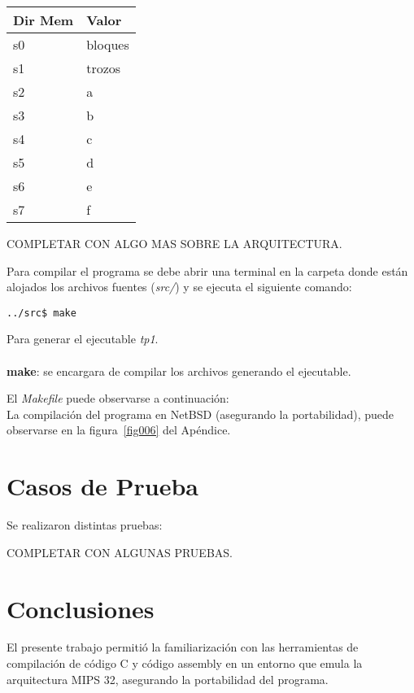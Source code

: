 \documentclass[a4paper,10pt]{article}
\begin{document}
\begin{center}
    \begin{tabular}{ | p{3cm} | p{3cm}  | }
    \hline
        Dir Mem & Valor \\ \hline
        s0 & bloques \\ \hline
        s1 & trozos \\ \hline
        s2 & a \\ \hline
        s3 & b \\ \hline
        s4 & c \\ \hline
        s5 & d \\ \hline
        s6 & e \\ \hline
        s7 & f \\ \hline
    \end{tabular}
\end{center}

COMPLETAR CON ALGO MAS SOBRE LA ARQUITECTURA.

Para compilar el programa se debe abrir una terminal en la carpeta donde están alojados los archivos fuentes (\textsl{src/}) y se ejecuta el siguiente comando:
\begin{verbatim}
../src$ make
\end{verbatim}
Para generar el ejecutable \textsl{tp1}.\\
\\
\textbf{make}: se encargara de compilar los archivos generando el ejecutable.

El \textsl{Makefile} puede observarse a continuación:\\


La compilación del programa en NetBSD (asegurando la portabilidad), puede observarse en la figura~\ref{fig006} del Apéndice.

\newpage
\section{Casos de Prueba}
Se realizaron distintas pruebas:

COMPLETAR CON ALGUNAS PRUEBAS.

\newpage
\section{Conclusiones}

El presente trabajo permitió la familiarización con las herramientas de compilación de código C y código assembly en un entorno que emula la arquitectura MIPS 32, asegurando la portabilidad del programa.
\end{document}
